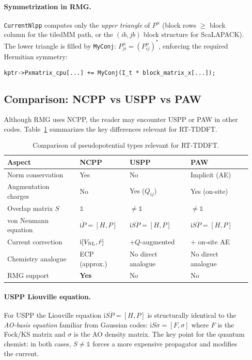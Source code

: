 \documentclass[12pt,letterpaper]{article}
\newcommand{\ii}{\mathrm{i}}
\newcommand{\VNL}{V_{\rm NL}}
\begin{document}
\paragraph{Symmetrization in RMG.}
\texttt{CurrentNlpp} computes only the \emph{upper triangle} of $P^\alpha$
(block rows $\geq$ block column for the tiledMM path, or the $(ib,jb)$ block
structure for ScaLAPACK).  The lower triangle is filled by
\texttt{MyConj}: $P^\alpha_{ji} = (P^\alpha_{ij})^*$, enforcing the required
Hermitian symmetry:
\begin{lstlisting}[style=cppstyle, caption={Hermitian symmetrization in CurrentNlpp.cpp (lower triangle)}]
kptr->Pxmatrix_cpu[...] += MyConj(I_t * block_matrix_x[...]);
\end{lstlisting}

\subsection{Comparison: NCPP vs USPP vs PAW}
\label{sec:pp:uspp}

Although RMG uses NCPP, the reader may encounter USPP or PAW in other codes.
Table~\ref{tab:pp_comparison} summarizes the key differences relevant for
RT-TDDFT.

\begin{table}[ht]
\centering
\caption{Comparison of pseudopotential types relevant for RT-TDDFT.}
\label{tab:pp_comparison}
\begin{tabular}{@{}llll@{}}
\toprule
Aspect & NCPP & USPP & PAW \\
\midrule
Norm conservation & Yes & No & Implicit (AE) \\
Augmentation charges & No & Yes ($Q_{ij}$) & Yes (on-site) \\
Overlap matrix $S$ & $\mathbb{1}$ & $\neq\mathbb{1}$ & $\neq\mathbb{1}$ \\
von Neumann equation & $\ii\dot{P}=[H,P]$ & $\ii S\dot{P}=[H,P]$ & $\ii S\dot{P}=[H,P]$ \\
Current correction & $\ii[\VNL,\hat{r}]$ & $+ Q$-augmented & $+$ on-site AE \\
Chemistry analogue & ECP (approx.) & No direct analogue & No direct analogue \\
RMG support & \textbf{Yes} & No & No \\
\bottomrule
\end{tabular}
\end{table}

\paragraph{USPP Liouville equation.}
For USPP the Liouville equation $\ii S\dot{P}=[H,P]$ is structurally identical
to the \emph{AO-basis equation} familiar from Gaussian codes:
$\ii S\dot{\sigma} = [F,\sigma]$ where $F$ is the Fock/KS matrix and $\sigma$
is the AO density matrix.  The key point for the quantum chemist: in
both cases, $S\neq\mathbb{1}$ forces a more expensive propagator and modifies
the current.
\end{document}
